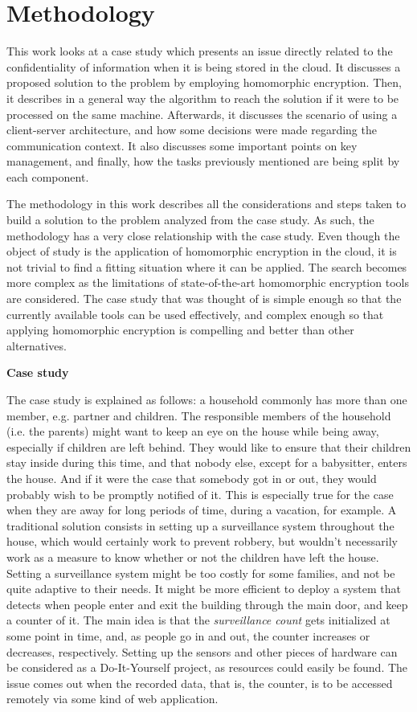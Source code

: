 \chapter{Methodology}
\label{methodology}

This work looks at a case study which presents an issue directly related to the confidentiality of information when it is being stored in the cloud. It discusses a proposed solution to the problem by employing homomorphic encryption. Then, it describes in a general way the algorithm to reach the solution if it were to be processed on the same machine. Afterwards, it discusses the scenario of using a client-server architecture, and how some decisions were made regarding the communication context. It also discusses some important points on key management, and finally, how the tasks previously mentioned are being split by each component. 

The methodology in this work describes all the considerations and steps taken to build a solution to the problem analyzed from the case study. As such, the methodology has a very close relationship with the case study. Even though the object of study is the application of homomorphic encryption in the cloud, it is not trivial to find a fitting situation where it can be applied. The search becomes more complex as the limitations of state-of-the-art homomorphic encryption tools are considered. The case study that was thought of is simple enough so that the currently available tools can be used effectively, and complex enough so that applying homomorphic encryption is compelling and better than other alternatives.

\textbf{Case study}

The case study is explained as follows: a household commonly has more than one member, e.g. partner and children. The responsible members of the household (i.e. the parents) might want to keep an eye on the house while being away, especially if children are left behind. They would like to ensure that their children stay inside during this time, and that nobody else, except for a babysitter, enters the house. And if it were the case that somebody got in or out, they would probably wish to be promptly notified of it. This is especially true for the case when they are away for long periods of time, during a vacation, for example. A traditional solution consists in setting up a surveillance system throughout the house, which would certainly work to prevent robbery, but wouldn't necessarily work as a measure to know whether or not the children have left the house. Setting a surveillance system might be too costly for some families, and not be quite adaptive to their needs. It might be more efficient to deploy a system that detects when people enter and exit the building through the main door, and keep a counter of it. The main idea is that the \textit{surveillance count} gets initialized at some point in time, and, as people go in and out, the counter increases or decreases, respectively. Setting up the sensors and other pieces of hardware can be considered as a Do-It-Yourself project, as resources could easily be found. The issue comes out when the recorded data, that is, the counter, is to be accessed remotely via some kind of web application. 

